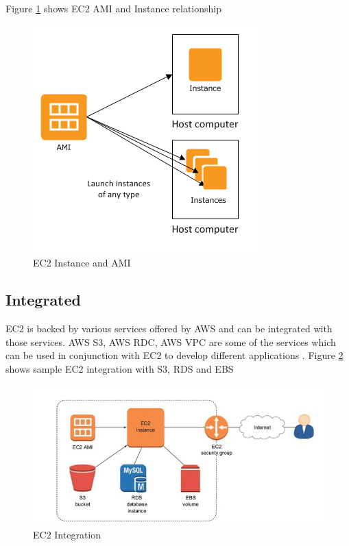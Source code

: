 Figure \ref{f:ec2-ami-instance} shows EC2 AMI and Instance relationship
\begin{figure}[!ht]
  \centering\includegraphics[width=\columnwidth]{images/ec2AMI.PNG}
  \caption{EC2 Instance and AMI \cite{www-aws-ec2instance}}\label{f:ec2-ami-instance}
\end{figure}

\subsection{Integrated}
EC2 is backed by various services offered by AWS and can be integrated with those services. AWS S3, AWS RDC, AWS VPC are some of the services which can be used in conjunction with EC2 to develop different applications \cite{www-aws-ec2}.
Figure \ref{f:ec2-integration} shows sample EC2 integration with S3, RDS and EBS 
\begin{figure}[!ht]
  \centering\includegraphics[width=\columnwidth]{images/ec2Integration.PNG}
  \caption{EC2 Integration \cite{www-medium-aws}}\label{f:ec2-integration}
\end{figure}

